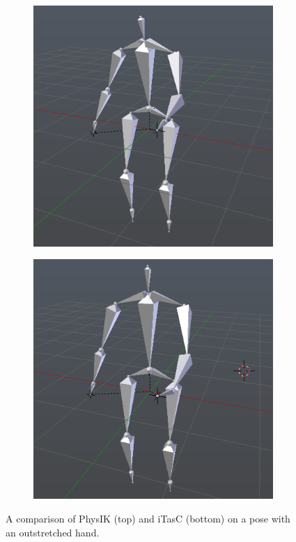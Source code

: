 \documentclass[10pt,twocolumn,letterpaper]{article}
\begin{document}
\begin{figure}
    \centering
    \begin{subfigure}{\columnwidth}
        \centering
        \includegraphics[width=.8\linewidth]{pose-hand.png}
    \end{subfigure}
    
    \begin{subfigure}{\columnwidth}
        \centering
        \includegraphics[width=.8\linewidth]{pose-hand-itasc.png}
    \end{subfigure}

    \caption{A comparison of PhysIK (top) and iTasC (bottom) on a pose with an outstretched hand.}
    \label{img:hand}
\end{figure}
\end{document}
